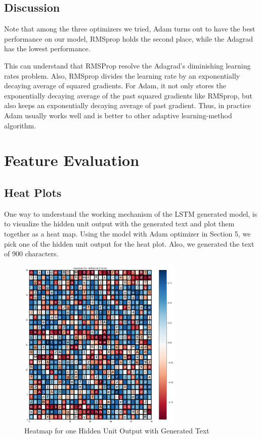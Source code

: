 \documentclass{article}
\begin{document}
\subsection{Discussion}
Note that among the three optimizers we tried, Adam turns out to have the best performance on our model, RMSprop holds the second place, while the Adagrad has the lowest performance. 

This can understand that RMSProp resolve the Adagrad’s diminishing learning rates problem. Also, RMSprop divides the learning rate by an exponentially decaying average of squared gradients. For Adam, it not only stores the exponentially decaying average of the past squared gradients like RMSprop, but also  keeps an exponentially decaying average of past gradient. Thus, in practice Adam usually works well and is better to other adaptive learning-method algorithm.
\newpage
\section{Feature Evaluation}
\subsection{Heat Plots}
One way to understand the working mechanism of the LSTM generated model, is to visualize the hidden unit output with the generated text and plot them together as a heat map. Using the model with Adam optimizer in Section 5, we pick one of the hidden unit output for the heat plot. Also, we generated the text of 900 characters. 
\begin{figure}[h]
\centering
\includegraphics[width=0.7\textwidth]{pics/heat_map.png}
\caption{Heatmap for one Hidden Unit Output with Generated Text}
\end{figure}
\end{document}
